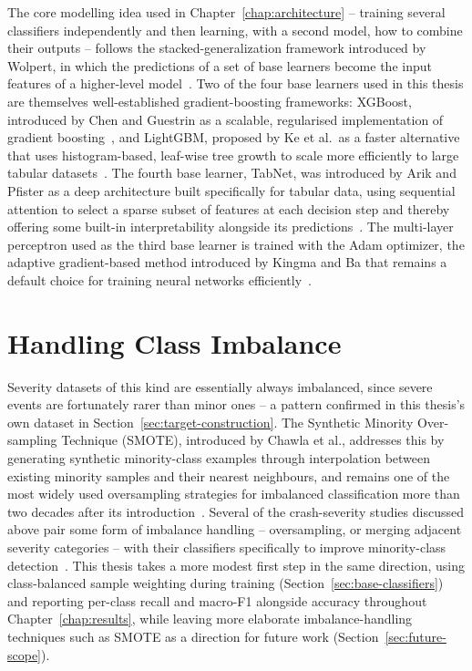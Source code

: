 The core modelling idea used in Chapter~\ref{chap:architecture} -- training several classifiers independently and then learning, with a second model, how to combine their outputs -- follows the stacked-generalization framework introduced by Wolpert, in which the predictions of a set of base learners become the input features of a higher-level model~\cite{wolpert1992stacked}. Two of the four base learners used in this thesis are themselves well-established gradient-boosting frameworks: XGBoost, introduced by Chen and Guestrin as a scalable, regularised implementation of gradient boosting~\cite{chen2016xgboost}, and LightGBM, proposed by Ke et al.\ as a faster alternative that uses histogram-based, leaf-wise tree growth to scale more efficiently to large tabular datasets~\cite{ke2017lightgbm}. The fourth base learner, TabNet, was introduced by Arik and Pfister as a deep architecture built specifically for tabular data, using sequential attention to select a sparse subset of features at each decision step and thereby offering some built-in interpretability alongside its predictions~\cite{arik2021tabnet}. The multi-layer perceptron used as the third base learner is trained with the Adam optimizer, the adaptive gradient-based method introduced by Kingma and Ba that remains a default choice for training neural networks efficiently~\cite{kingma2015adam}.

\section{Handling Class Imbalance}

Severity datasets of this kind are essentially always imbalanced, since severe events are fortunately rarer than minor ones -- a pattern confirmed in this thesis's own dataset in Section~\ref{sec:target-construction}. The Synthetic Minority Over-sampling Technique (SMOTE), introduced by Chawla et al., addresses this by generating synthetic minority-class examples through interpolation between existing minority samples and their nearest neighbours, and remains one of the most widely used oversampling strategies for imbalanced classification more than two decades after its introduction~\cite{chawla2002smote}. Several of the crash-severity studies discussed above pair some form of imbalance handling -- oversampling, or merging adjacent severity categories -- with their classifiers specifically to improve minority-class detection~\cite{zhu2021crash}. This thesis takes a more modest first step in the same direction, using class-balanced sample weighting during training (Section~\ref{sec:base-classifiers}) and reporting per-class recall and macro-F1 alongside accuracy throughout Chapter~\ref{chap:results}, while leaving more elaborate imbalance-handling techniques such as SMOTE as a direction for future work (Section~\ref{sec:future-scope}).

